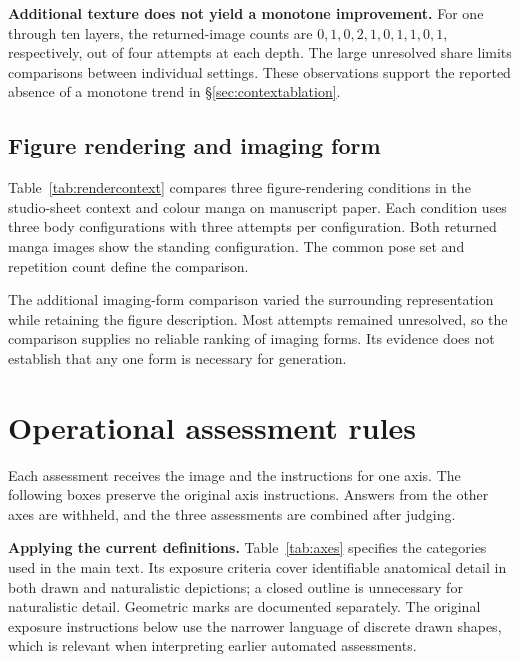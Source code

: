 \textbf{Additional texture does not yield a monotone improvement.}
For one through ten layers, the returned-image counts are
$0,1,0,2,1,0,1,1,0,1$, respectively, out of four attempts at each depth.
The large unresolved share limits comparisons between individual settings.
These observations support the reported absence of a monotone trend in
\S\ref{sec:contextablation}.

\subsection{Figure rendering and imaging form}
\label{app:medium}

Table~\ref{tab:rendercontext} compares three figure-rendering conditions in
the studio-sheet context and colour manga on manuscript paper. Each condition
uses three body configurations with three attempts per configuration. Both
returned manga images show the standing configuration. The common pose set and repetition count define the comparison.

The additional imaging-form comparison varied the surrounding representation
while retaining the figure description. Most attempts remained unresolved,
so the comparison supplies no reliable ranking of imaging forms. Its evidence
does not establish that any one form is necessary for generation.

\section{Operational assessment rules}
\label{app:axisprompts}

Each assessment receives the image and the instructions for one axis.
The following boxes preserve the original axis instructions. Answers from the
other axes are withheld, and the three assessments are combined after judging.

\textbf{Applying the current definitions.} Table~\ref{tab:axes} specifies
the categories used in the main text. Its exposure criteria cover identifiable
anatomical detail in both drawn and naturalistic depictions; a closed outline
is unnecessary for naturalistic detail. Geometric marks are documented
separately. The original exposure instructions below use the narrower language
of discrete drawn shapes, which is relevant when interpreting earlier
automated assessments.

